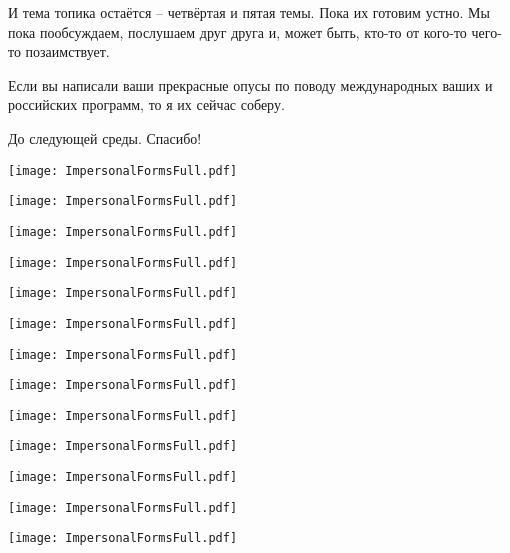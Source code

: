 \documentclass[main.tex]{subfiles}
\begin{document}
И тема топика остаётся -- четвёртая и пятая темы.
Пока их готовим устно.
Мы пока пообсуждаем, послушаем друг друга и, может быть, кто-то от кого-то чего-то позаимствует.

Если вы написали ваши прекрасные опусы по поводу международных ваших и российских программ, то я их сейчас соберу.

До следующей среды.
Спасибо!

\newpage
{}
\label{subsec:impersonal-forms-full-view}

{\parindent33pt\texttt{[image: ImpersonalFormsFull.pdf]}}\newpage

{\parindent33pt\texttt{[image: ImpersonalFormsFull.pdf]}}\newpage

{\parindent33pt\texttt{[image: ImpersonalFormsFull.pdf]}}\newpage

{\parindent33pt\texttt{[image: ImpersonalFormsFull.pdf]}}\newpage

{\parindent33pt\texttt{[image: ImpersonalFormsFull.pdf]}}\newpage

{\parindent33pt\texttt{[image: ImpersonalFormsFull.pdf]}}\newpage

{\parindent33pt\texttt{[image: ImpersonalFormsFull.pdf]}}\newpage

{\parindent33pt\texttt{[image: ImpersonalFormsFull.pdf]}}\newpage

{\parindent33pt\texttt{[image: ImpersonalFormsFull.pdf]}}\newpage

{\parindent33pt\texttt{[image: ImpersonalFormsFull.pdf]}}\newpage

{\parindent33pt\texttt{[image: ImpersonalFormsFull.pdf]}}\newpage

{\parindent33pt\texttt{[image: ImpersonalFormsFull.pdf]}}\newpage

{\parindent33pt\texttt{[image: ImpersonalFormsFull.pdf]}}
\end{document}
